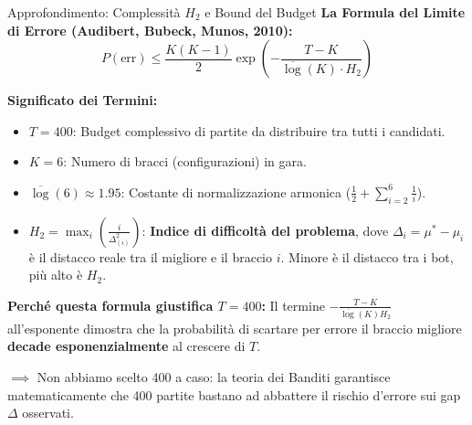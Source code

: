 \documentclass[10pt]{beamer}
\begin{document}
\begin{frame}{Approfondimento: Complessità $H_2$ e Bound del Budget}
    \textbf{La Formula del Limite di Errore (Audibert, Bubeck, Munos, 2010):}
    $$P(\text{err}) \le \frac{K(K-1)}{2} \exp\left( - \frac{T - K}{\overline{\log}(K) \cdot H_2} \right)$$
    
    \vspace{0.15cm}
    \textbf{Significato dei Termini:}
    \begin{itemize}
        \item $T = 400$: Budget complessivo di partite da distribuire tra tutti i candidati.
        \item $K = 6$: Numero di bracci (configurazioni) in gara.
        \item $\overline{\log}(6) \approx 1.95$: Costante di normalizzazione armonica ($\frac{1}{2} + \sum_{i=2}^6 \frac{1}{i}$).
        \item $H_2 = \max_{i} \left(\frac{i}{\Delta_{(i)}^2}\right)$: \textbf{Indice di difficoltà del problema}, dove $\Delta_i = \mu^* - \mu_i$ è il distacco reale tra il migliore e il braccio $i$. Minore è il distacco tra i bot, più alto è $H_2$.
    \end{itemize}
    
    \vspace{0.15cm}
    \textbf{Perché questa formula giustifica $T=400$:}
    Il termine $-\frac{T-K}{\overline{\log}(K) H_2}$ all'esponente dimostra che la probabilità di scartare per errore il braccio migliore \textbf{decade esponenzialmente} al crescere di $T$. 
    
    \vspace{0.1cm}
    \footnotesize
    $\implies$ Non abbiamo scelto 400 a caso: la teoria dei Banditi garantisce matematicamente che 400 partite bastano ad abbattere il rischio d'errore sui gap $\Delta$ osservati.
\end{frame}
\end{document}
